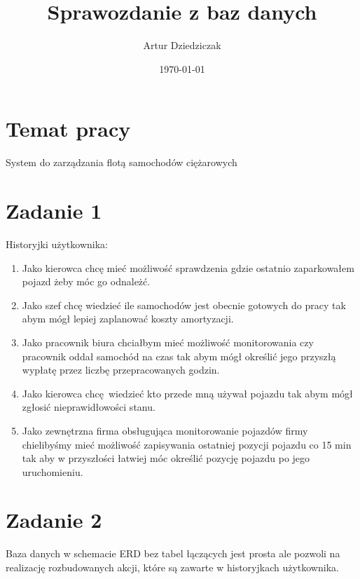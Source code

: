 \documentclass{article}
\title{Sprawozdanie z baz danych}
\author{Artur Dziedziczak}
\date{\today}
\begin{document}
\maketitle

\section{Temat pracy}

System do zarządzania flotą samochodów ciężarowych

\section{Zadanie 1}
 Historyjki użytkownika:

\begin{enumerate}
    \item Jako kierowca chcę mieć możliwość sprawdzenia gdzie ostatnio zaparkowałem pojazd żeby móc go odnależć.
    \item Jako szef chcę wiedzieć ile samochodów jest obecnie gotowych do pracy tak abym mógł lepiej zaplanować koszty amortyzacji.
    \item Jako pracownik biura chciałbym mieć możliwość monitorowania czy pracownik oddał samochód na czas tak abym mógł określić jego przyszłą wypłatę przez liczbę przepracowanych godzin.
    \item Jako kierowca chcę wiedzieć kto przede mną używał pojazdu tak abym mógł zgłosić nieprawidłowości stanu.
    \item Jako zewnętrzna firma obsługująca monitorowanie pojazdów firmy chielibyśmy mieć możliwość zapisywania ostatniej pozycji pojazdu co 15 min tak aby w przyszłości łatwiej móc określić pozycję pojazdu po jego uruchomieniu.
\end{enumerate}

\section{Zadanie 2}
Baza danych w schemacie ERD bez tabel łączących jest prosta ale pozwoli na 
realizację rozbudowanych akcji, które są zawarte w historyjkach użytkownika.
\end{document}
